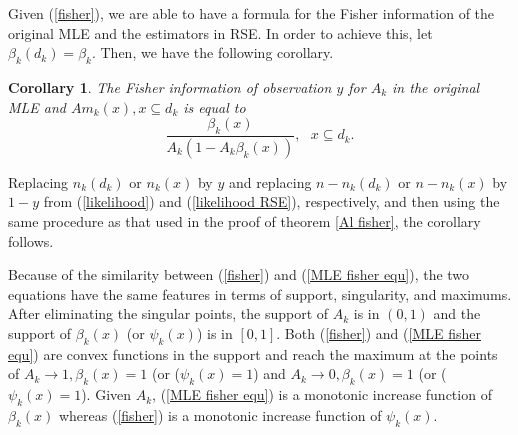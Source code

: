 \documentclass[10pt,onecolumn]{IEEEtran}
\newtheorem{corollary}{\bf Corollary}
\begin{document}
Given (\ref{fisher}), we are able to have a formula for the Fisher information of the original MLE and the estimators in RSE. In order to achieve this, let $\beta_k(d_k)=\beta_k$. Then, we have the following corollary.
\begin{corollary} \label{MLE fisher}
The Fisher information of observation $y$ for $A_k$ in the original MLE and $Am_k(x), x \subseteq d_k$ is equal to
\begin{equation}
 \dfrac{\beta_k(x)}{A_k (1-A_k \beta_k(x))}, \mbox{     } x \subseteq d_k.
 \label{MLE fisher equ}
 \end{equation}
\end{corollary}
\begin{IEEEproof}
Replacing $n_k(d_k)$ or $n_k(x)$ by $y$ and replacing $n-n_k(d_k)$ or $n-n_k(x)$ by $1-y$ from (\ref{likelihood}) and (\ref{likelihood RSE}), respectively, and then using the same procedure as that used in the proof of theorem \ref{Al fisher}, the corollary follows.
\end{IEEEproof}
Because of the similarity between (\ref{fisher}) and (\ref{MLE fisher equ}), the two equations have the same features in terms of support, singularity, and maximums. After
eliminating the singular points, the support of $A_k$ is in $(0,1)$ and the support of $\beta_k(x)$ (or $\psi_k(x)$) is in $[0, 1]$.
Both (\ref{fisher}) and (\ref{MLE fisher equ}) are convex functions in the support and reach the maximum at the points of  $A_k \rightarrow 1, \beta_k(x) =1$ (or ($\psi_k(x)=1$) and $A_k\rightarrow 0, \beta_k(x)=1$ (or ($\psi_k(x)=1$).
Given $A_k$, (\ref{MLE fisher equ}) is  a monotonic increase function of $\beta_k(x)$ whereas (\ref{fisher}) is a monotonic increase function of $\psi_k(x)$. 
\end{document}
